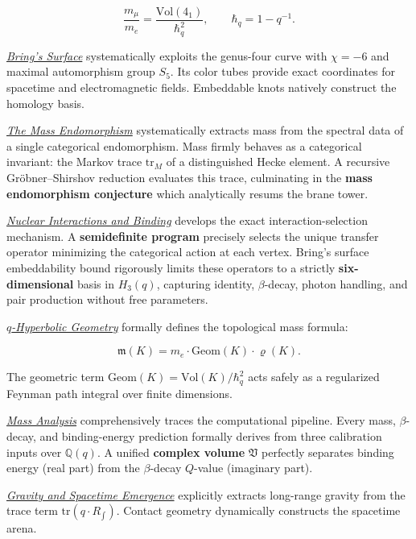 \[
  \frac{m_\mu}{m_e} = \frac{\mathrm{Vol}(4_1)}{\hbar_q^{2}}, \qquad \hbar_q = 1 - q^{-1}.
\]

\hyperref[chap:brings-surface]{\emph{Bring's Surface}} systematically exploits the genus-four curve with $\chi = -6$ and maximal automorphism group $S_5$. Its color tubes provide exact coordinates for spacetime and electromagnetic fields. Embeddable knots natively construct the homology basis.

\hyperref[chap:mass-endomorphism]{\emph{The Mass Endomorphism}} systematically extracts mass from the spectral data of a single categorical endomorphism. Mass firmly behaves as a categorical invariant: the Markov trace $\mathrm{tr}_M$ of a distinguished Hecke element. A recursive Gröbner–Shirshov reduction evaluates this trace, culminating in the \textbf{mass endomorphism conjecture} which analytically resums the brane tower.

\hyperref[chap:nuclear-interactions]{\emph{Nuclear Interactions and Binding}} develops the exact interaction-selection mechanism. A \textbf{semidefinite program} precisely selects the unique transfer operator minimizing the categorical action at each vertex. Bring's surface embeddability bound rigorously limits these operators to a strictly \textbf{six-dimensional} basis in $H_3(q)$, capturing identity, $\beta$-decay, photon handling, and pair production without free parameters.

\hyperref[chap:climax-volume-mass]{\emph{$q$-Hyperbolic Geometry}} formally defines the topological mass formula:

\[
  \mathfrak{m}(K) = m_e \cdot \mathrm{Geom}(K) \cdot \varrho(K).
\]

The geometric term $\mathrm{Geom}(K) =\allowbreak{} \mathrm{Vol}(K)/\hbar_q^{2}$ acts safely as a regularized Feynman path integral over finite dimensions.

\hyperref[chap:mass-theory]{\emph{Mass Analysis}} comprehensively traces the computational pipeline. Every mass, $\beta$-decay, and binding-energy prediction formally derives from three calibration inputs over $\mathbb{Q}(q)$. A unified \textbf{complex volume} $\mathfrak{V}$ perfectly separates binding energy (real part) from the $\beta$-decay $Q$-value (imaginary part).

\hyperref[chap:gravity-spacetime-emergence]{\emph{Gravity and Spacetime Emergence}} explicitly extracts long-range gravity from the trace term $\mathrm{tr}(q \cdot R_{\int})$. Contact geometry dynamically constructs the spacetime arena.

